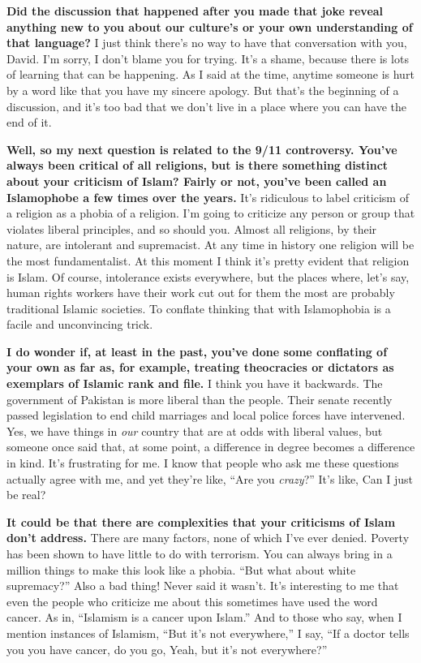 \textbf{Did the discussion that happened after you made that joke reveal
anything new to you about our culture's or your own understanding of
that language?} I just think there's no way to have that conversation
with you, David. I'm sorry, I don't blame you for trying. It's a shame,
because there is lots of learning that can be happening. As I said at
the time, anytime someone is hurt by a word like that you have my
sincere apology. But that's the beginning of a discussion, and it's too
bad that we don't live in a place where you can have the end of it.

\textbf{Well, so my next question is related to the 9/11 controversy.
You've always been critical of all religions, but is there something
distinct about your criticism of Islam? Fairly or not, you've been
called an Islamophobe a few times over the years.} It's ridiculous to
label criticism of a religion as a phobia of a religion. I'm going to
criticize any person or group that violates liberal principles, and so
should you. Almost all religions, by their nature, are intolerant and
supremacist. At any time in history one religion will be the most
fundamentalist. At this moment I think it's pretty evident that religion
is Islam. Of course, intolerance exists everywhere, but the places
where, let's say, human rights workers have their work cut out for them
the most are probably traditional Islamic societies. To conflate
thinking that with Islamophobia is a facile and unconvincing trick.

\textbf{I do wonder if, at least in the past, you've done some
conflating of your own as far as, for example, treating theocracies or
dictators as exemplars of Islamic rank and file.} I think you have it
backwards. The government of Pakistan is more liberal than the people.
Their senate recently passed legislation to end child marriages and
local police forces have intervened. Yes, we have things in \emph{our}
country that are at odds with liberal values, but someone once said
that, at some point, a difference in degree becomes a difference in
kind. It's frustrating for me. I know that people who ask me these
questions actually agree with me, and yet they're like, ``Are you
\emph{crazy}?'' It's like, Can I just be real?

\textbf{It could be that there are complexities that your criticisms of
Islam don't address.} There are many factors, none of which I've ever
denied. Poverty has been shown to have little to do with terrorism. You
can always bring in a million things to make this look like a phobia.
``But what about white supremacy?'' Also a bad thing! Never said it
wasn't. It's interesting to me that even the people who criticize me
about this sometimes have used the word cancer. As in, ``Islamism is a
cancer upon Islam.'' And to those who say, when I mention instances of
Islamism, ``But it's not everywhere,'' I say, ``If a doctor tells you
you have cancer, do you go, Yeah, but it's not everywhere?''

